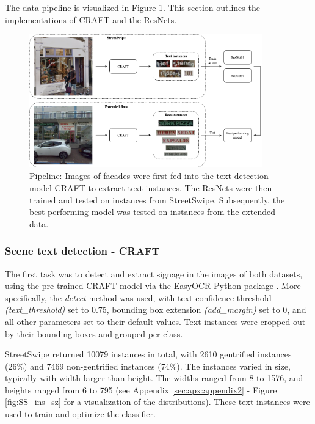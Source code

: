 The data pipeline is visualized in Figure \ref{fig:pipeline}. This section outlines the implementations of CRAFT and the ResNets.

\begin{figure}
    \centering
    \includegraphics[width=0.9\textwidth]{media/methodology/Pipeline.png}
    \caption{Pipeline: Images of facades were first fed into the text detection model CRAFT to extract text instances. The ResNets were then trained and tested on instances from StreetSwipe. Subsequently, the best performing model was tested on instances from the extended data.}
    \label{fig:pipeline}
\end{figure}


\subsubsection{Scene text detection - CRAFT}

The first task was to detect and extract signage in the images of both datasets, using the pre-trained CRAFT model via the EasyOCR Python package \cite{noauthor_jaided_nodate}. More specifically, the \textit{detect} method was used, with text confidence threshold \textit{(text\_threshold)} set to 0.75, bounding box extension \textit{(add\_margin)} set to 0, and all other parameters set to their default values. Text instances were cropped out by their bounding boxes and grouped per class.

StreetSwipe returned 10079 instances in total, with 2610 gentrified instances (26\%) and 7469 non-gentrified instances (74\%). The instances varied in size, typically with width larger than height. The widths ranged from 8 to 1576, and heights ranged from 6 to 795 (see Appendix \ref{sec:apx:appendix2} - Figure \ref{fig:SS_ins_sz} for a visualization of the distributions). These text instances were used to train and optimize the classifier.


